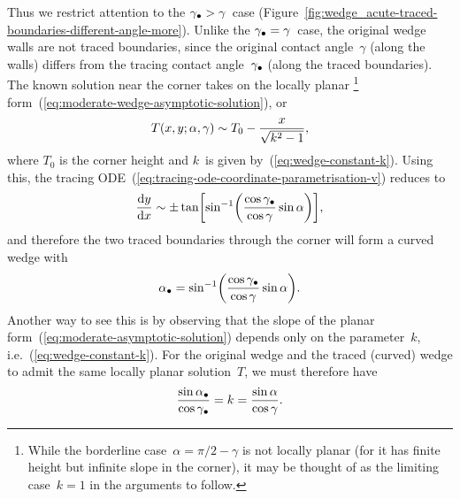 Thus we restrict attention to the $\gamma_\bullet > \gamma$~case
(Figure~\ref{fig:wedge_acute-traced-boundaries-different-angle-more}).
Unlike the $\gamma_\bullet = \gamma$~case,
the original wedge walls are not traced boundaries,
since the original contact angle~$\gamma$
(along the walls)
differs from the tracing contact angle~$\gamma_\bullet$
(along the traced boundaries).
The known solution near the corner takes on
the locally planar%
\footnote{
  While the borderline case~$\alpha = \pi/2 - \gamma$ is not locally planar
  (for it has finite height but infinite slope in the corner),
  it may be thought of as the limiting case~$k = 1$
  in the arguments to follow.
}
form~(\ref{eq:moderate-wedge-asymptotic-solution}),
or
\begin{equation}
  T (x, y; \alpha, \gamma) \sim T_0 - \frac{x}{\sqrt{k^2 - 1}},
  \label{eq:moderate-asymptotic-solution}
\end{equation}
where $T_0$ is the corner height
and $k$~is given by~(\ref{eq:wedge-constant-k}).
Using this,
the tracing ODE~(\ref{eq:tracing-ode-coordinate-parametrisation-v})
reduces to
\begin{equation}
  \tder{y}{x} \asy
    \pm \tan\squarebr*{
      \sin^{-1}\roundbr*{
        \frac{\cos\tr{\gamma}}{\cos\gamma} \sin\alpha
      }
    },
  \label{eq:moderate-asymptotic-tracing-ode-different-angle}
\end{equation}
and therefore the two traced boundaries through the corner
will form a curved wedge with 
\begin{equation}
  \tr{\alpha} =
    \sin^{-1}\roundbr*{
      \frac{\cos\tr{\gamma}}{\cos\gamma} \sin\alpha
    }.
  \label{eq:moderate-reduced-half-angle}
\end{equation}
Another way to see this is by observing that
the slope of the planar form~(\ref{eq:moderate-asymptotic-solution})
depends only on the parameter~$k$, i.e.~(\ref{eq:wedge-constant-k}).
For the original wedge and the traced (curved) wedge
to admit the same locally planar solution~$T$,
we must therefore have
\begin{equation}
  \frac{\sin\alpha_\bullet}{\cos\gamma_\bullet} = k = \frac{\sin\alpha}{\cos\gamma}.
  \label{eq:moderate-constant-k-different-angle}
\end{equation}

